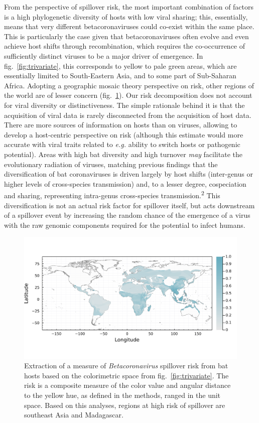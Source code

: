 \documentclass[11pt]{article}
\makeatletter
\def\maxwidth{\ifdim\Gin@nat@width>\linewidth\linewidth
\else\Gin@nat@width\fi}
\let\Oldincludegraphics\includegraphics
\renewcommand{\includegraphics}[1]{\Oldincludegraphics[width=\maxwidth]{#1}}
\makeatother
\begin{document}
From the perspective of spillover risk, the most important combination
of factors is a high phylogenetic diversity of hosts with low viral
sharing; this, essentially, means that very different betacoronaviruses
could co-exist within the same place. This is particularly the case
given that betacoronaviruses often evolve and even achieve host shifts
through recombination, which requires the co-occurrence of sufficiently
distinct viruses to be a major driver of emergence. In
fig.~\ref{fig:trivariate}, this corresponds to yellow to pale green
areas, which are essentially limited to South-Eastern Asia, and to some
part of Sub-Saharan Africa. Adopting a geographic mosaic theory
perspective on risk, other regions of the world are of lesser concern
(fig.~\ref{fig:risk}). Our risk decomposition does not account for viral
diversity or distinctiveness. The simple rationale behind it is that the
acquisition of viral data is rarely disconnected from the acquisition of
host data. There are more sources of information on hosts than on
viruses, allowing to develop a host-centric perspective on risk
(although this estimate would more accurate with viral traits related to
\emph{e.g.} ability to switch hosts or pathogenic potential). Areas with
high bat diversity and high turnover \emph{may} facilitate the
evolutionary radiation of viruses, matching previous findings that the
diversification of bat coronaviruses is driven largely by host shifts
(inter-genus or higher levels of cross-species transmission) and, to a
lesser degree, cospeciation and sharing, representing intra-genus
cross-species transmission.\textsuperscript{2} This diversification is
not an actual risk factor for spillover itself, but acts downstream of a
spillover event by increasing the random chance of the emergence of a
virus with the raw genomic components required for the potential to
infect humans.

\begin{figure}
\hypertarget{fig:risk}{%
\centering
\includegraphics{figures/risk_map.png}
\caption{Extraction of a measure of \emph{Betacoronavirus} spillover
risk from bat hosts based on the colorimetric space from
fig.~\ref{fig:trivariate}. The risk is a composite measure of the color
value and angular distance to the yellow hue, as defined in the methods,
ranged in the unit space. Based on this analyses, regions at high risk
of spillover are southeast Asia and Madagascar.}\label{fig:risk}
}
\end{figure}
\end{document}
